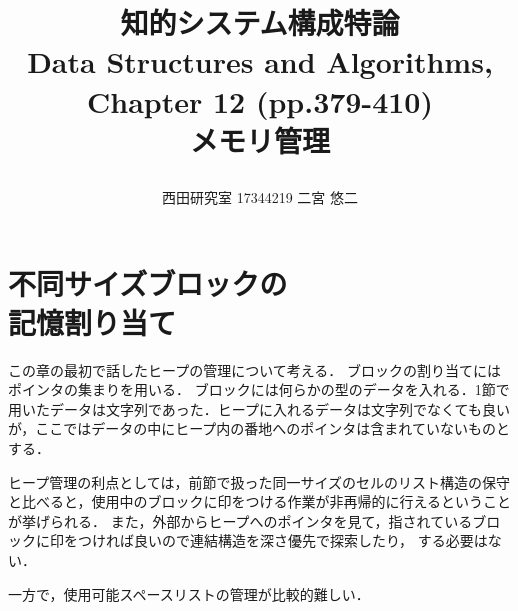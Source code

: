 \documentclass[twocolumn,10pt]{jarticle}
\title{\vspace{-20truemm}
{\normalsize \rightline{平成29年\ 5月\ 23日}}  %
{\large 知的システム構成特論\\} %
{\large Data Structures and Algorithms, %
Chapter 12 (pp.379-410)\\} %
メモリ管理 %
\date{}
\vspace{-2truemm}}
\author{西田研究室 17344219 二宮 悠二} %
\begin{document}
\twocolumn[\maketitle]
\setcounter{section}{3}
\section{不同サイズブロックの\\記憶割り当て}
この章の最初で話したヒープの管理について考える．
ブロックの割り当てにはポインタの集まりを用いる．
ブロックには何らかの型のデータを入れる．1節で用いたデータは文字列であった．ヒープに入れるデータは文字列でなくても良いが，ここではデータの中にヒープ内の番地へのポインタは含まれていないものとする．

ヒープ管理の利点としては，前節で扱った同一サイズのセルのリスト構造の保守と比べると，使用中のブロックに印をつける作業が非再帰的に行えるということが挙げられる．
また，外部からヒープへのポインタを見て，指されているブロックに印をつければ良いので連結構造を深さ優先で探索したり，
する必要はない．

一方で，使用可能スペースリストの管理が比較的難しい．
\end{document}
